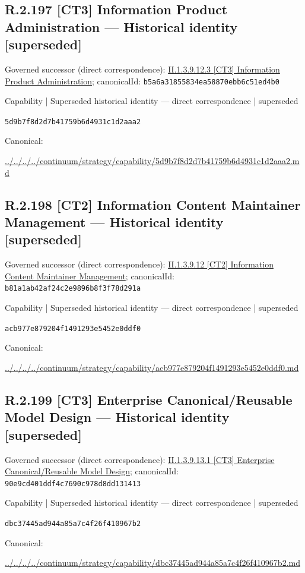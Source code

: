 \documentclass[10pt,a4paper]{article}
\begin{document}
\subsection*{R.2.197 [CT3] Information Product Administration — Historical identity [superseded]}
Governed successor (direct correspondence): \hyperref[element-b5a6a31855834ea58870ebb6c51ed4b0]{II.1.3.9.12.3 [CT3] Information Product Administration}; canonicalId: \texttt{b5a6a31855834ea58870ebb6c51ed4b0}\par
\label{element-5d9b7f8d2d7b41759b6d4931c1d2aaa2}
{\small Capability | Superseded historical identity — direct correspondence | superseded}\par
\texttt{5d9b7f8d2d7b41759b6d4931c1d2aaa2}\par
Canonical: \par
{\footnotesize\url{../../../../continuum/strategy/capability/5d9b7f8d2d7b41759b6d4931c1d2aaa2.md}}\par
\subsection*{R.2.198 [CT2] Information Content Maintainer Management — Historical identity [superseded]}
Governed successor (direct correspondence): \hyperref[element-b81a1ab42af24c2e9896b8f3f78d291a]{II.1.3.9.12 [CT2] Information Content Maintainer Management}; canonicalId: \texttt{b81a1ab42af24c2e9896b8f3f78d291a}\par
\label{element-acb977e879204f1491293e5452e0ddf0}
{\small Capability | Superseded historical identity — direct correspondence | superseded}\par
\texttt{acb977e879204f1491293e5452e0ddf0}\par
Canonical: \par
{\footnotesize\url{../../../../continuum/strategy/capability/acb977e879204f1491293e5452e0ddf0.md}}\par
\subsection*{R.2.199 [CT3] Enterprise Canonical/Reusable Model Design — Historical identity [superseded]}
Governed successor (direct correspondence): \hyperref[element-90e9cd401ddf4c7690c978d8dd131413]{II.1.3.9.13.1 [CT3] Enterprise Canonical/Reusable Model Design}; canonicalId: \texttt{90e9cd401ddf4c7690c978d8dd131413}\par
\label{element-dbc37445ad944a85a7c4f26f410967b2}
{\small Capability | Superseded historical identity — direct correspondence | superseded}\par
\texttt{dbc37445ad944a85a7c4f26f410967b2}\par
Canonical: \par
{\footnotesize\url{../../../../continuum/strategy/capability/dbc37445ad944a85a7c4f26f410967b2.md}}\par
\end{document}
